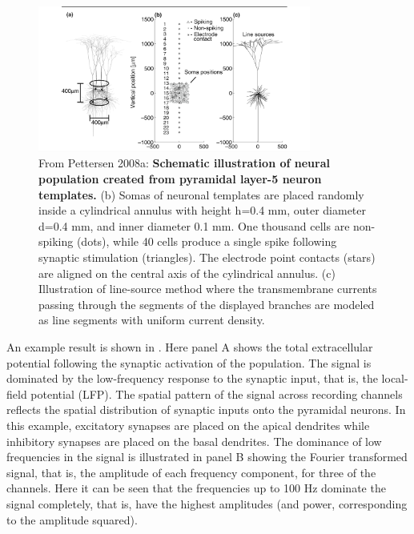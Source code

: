 \begin{figure}[!ht]
\begin{center}
\includegraphics[width=0.8\textwidth]{Figures/Spikes/MUA-2}
\end{center}
\caption[]{
From Pettersen 2008a: \textbf{Schematic illustration of neural population created from pyramidal layer-5 neuron templates.} (b) Somas of neuronal templates are placed randomly inside a cylindrical annulus with height h=0.4 mm, outer diameter d=0.4 mm, and inner diameter 0.1 mm. One thousand cells are non-spiking (dots), while 40 cells produce a single spike following synaptic stimulation
(triangles). The electrode point contacts (stars) are aligned on the central axis of the cylindrical annulus. (c) Illustration of line-source method where the transmembrane currents passing through the 
segments of the displayed branches are modeled as line segments with uniform current density.}
\label{fig:Spikes:MUA-population}
\end{figure}

An example result is shown in . Here panel A shows the total extracellular potential following the synaptic activation of the population. The signal
is dominated by the low-frequency response to the synaptic input, that is, the local-field potential (LFP). The spatial pattern of the signal across recording channels reflects the
spatial distribution of synaptic inputs onto the pyramidal neurons. In this example, excitatory synapses are placed on the apical dendrites while inhibitory synapses are placed on the basal dendrites.
The dominance of low frequencies in the signal is illustrated in panel B showing the Fourier transformed signal, that is, the amplitude of each frequency component, for three of the channels.
Here it can be seen that the frequencies up to 100 Hz dominate the signal completely, that is, have the highest amplitudes (and power, corresponding to the amplitude squared). 

